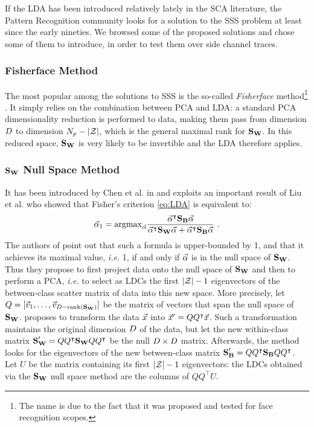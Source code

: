 If the LDA has been introduced relatively lately in the SCA literature, the Pattern Recognition community looks for a solution to the SSS problem at least since the early nineties. We browsed some of the proposed solutions and chose some of them to introduce, in order to test them over side channel traces.

\subsubsection{Fisherface Method}
The most popular among the solutions to SSS is the so-called {\em Fisherface} method\footnote{The name is due to the fact that it was proposed and tested for face recognition scopes.} \cite{eigenfaces}. It simply relies on the combination between PCA and LDA: a standard PCA dimensionality reduction is performed to data, making them pass from dimension $D$ to dimension $N_p-\lvert\mathcal{Z}\rvert$, which is the general maximal rank for $\textbf{S}_{\textbf{W}}$. In this reduced space, $\textbf{S}_{\textbf{W}}$ is very likely to be invertible and the LDA therefore applies.

\subsubsection{$\textbf{S}_{\textbf{W}}$ Null Space Method}
It has been introduced by Chen et al. in \cite{Chen2000} and exploits an important result of Liu et al. \cite{liu1992generalized} who showed that Fisher's criterion \eqref{eq:LDA} is equivalent to:
 \begin{equation}
 \vec{\alpha}_1=\mathrm{argmax}_{\vec{\alpha}} \frac{\vec{\alpha}^\intercal \textbf{S}_{\textbf{B}} \vec{\alpha}}{\vec{\alpha}^\intercal \textbf{S}_{\textbf{W}} \vec{\alpha} + \vec{\alpha}^\intercal \textbf{S}_{\textbf{B}} \vec{\alpha}} \mbox{ .}
 \end{equation}
The authors of \cite{Chen2000} point out that such a formula is upper-bounded by 1, and that it achieves its maximal value, \textit{i.e.} 1, if and only if  $\vec{\alpha}$ is in the null space of $\textbf{S}_{\textbf{W}}$. Thus they propose to first project data onto the null space of $\textbf{S}_{\textbf{W}}$ and then to perform a PCA, \textit{i.e.} to select as LDCs the first $\lvert\mathcal{Z}\rvert - 1$ eigenvectors of the between-class scatter matrix of data into this new space. More precisely, let $Q = [\vec{v}_1, \dots, \vec{v}_{D - \mathrm{rank}(\textbf{S}_{\textbf{W}})}]$ be the matrix of vectors that span the null space of $\textbf{S}_{\textbf{W}}$. \cite{Chen2000} proposes to transform the data $\vec{x}$ into $\vec{x}^\prime = QQ^\intercal\vec{x}$. Such a transformation maintains the original dimension $D$ of the data, but let the new within-class matrix $\textbf{S}_{\textbf{W}}' = QQ^\intercal\textbf{S}_{\textbf{W}} QQ^\intercal$ be the null $D \times D$ matrix. Afterwards, the method looks for the eigenvectors of the new between-class matrix $\textbf{S}_{\textbf{B}}' = QQ^\intercal\textbf{S}_{\textbf{B}} QQ^\intercal$. Let $U$ be the matrix containing its first $\lvert\mathcal{Z}\rvert - 1$ eigenvectors: the LDCs obtained via the $\textbf{S}_{\textbf{W}}$ null space method are the columns of $QQ^\intercal U$.

